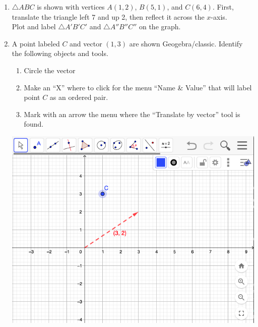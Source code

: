 \begin{enumerate}
\item $\triangle ABC$ is shown with vertices $A(1,2)$, $B(5,1)$, and $C(6,4)$. First, translate the triangle left 7 and up 2, then reflect it across the $x$-axis. \\[0.5cm]
Plot and label $\triangle A'B'C'$ and $\triangle A''B''C''$ on the graph.
  \begin{center}
    \end{center}

\item A point labeled $C$ and vector $(1,3)$ are shown Geogebra/classic. Identify the following objects and tools.
  \begin{enumerate}
    \item Circle the vector
    \item Make an ``X'' where to click for the menu ``Name \& Value'' that will label point $C$ as an ordered pair.
    \item Mark with an arrow the menu where the ``Translate by vector'' tool is found.
  \end{enumerate}
  \begin{flushright}
    \includegraphics[width=6in]{../graphics/08bGeogebra_toolbar.png}
  \end{flushright}


\end{enumerate}
